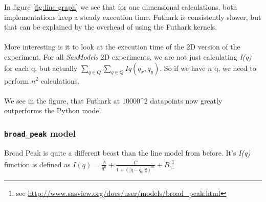 \documentclass[11pt]{article}
\newcommand{\sasmodels}{\textit{SasModels}}
\newcommand{\iq}{\textit{I(q)}}
\begin{document}
In figure \ref{fig:line-graph} we see that for one dimensional calculations,
both implementations keep a steady execution time. Futhark is consistently 
slower, but that can be explained by the overhead of using the Futhark kernels.
\\\\
More interesting is it to look at the execution time of the 2D version of the 
experiment. For all \sasmodels{} 2D experiments, we are not just calculating \iq
for each q, but actually $\sum_{q \in Q} \sum_{q \in Q} Iq(q_x, q_y)$.
So if we have $n$ q, we need to perform $n^2$ calculations.
\\\\
We see in the figure, that Futhark at 10000^2 datapoints now greatly outperforms
the Python model.

\subsubsection{\texttt{broad\_peak} model}
Broad Peak is quite a different beast than the line model from before. It's \iq
function is defined as 
$I(q) = \frac{A}{q^n} + \frac{C}{1 + (|q - q_0|\xi)^m} + B$.\footnote{see \url{http://www.sasview.org/docs/user/models/broad_peak.html}}
\end{document}
